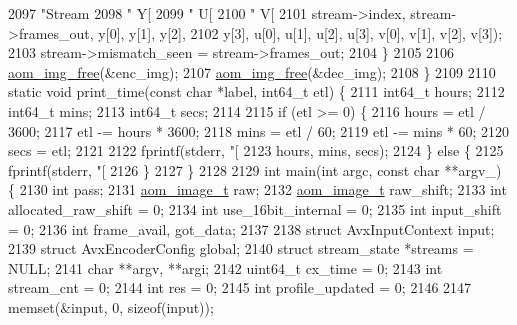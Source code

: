 \begin{DoxyCodeInclude}
{{{{{{{{{{{{{{{{{{{{{{{{{{{{{{{{{{{{{{{{{{{{{2097                           \textcolor{stringliteral}{"Stream %
2098                           \textcolor{stringliteral}{" Y[%
2099                           \textcolor{stringliteral}{" U[%
2100                           \textcolor{stringliteral}{" V[%
2101                           stream->index, stream->frames\_out, y[0], y[1], y[2],
2102                           y[3], u[0], u[1], u[2], u[3], v[0], v[1], v[2], v[3]);
2103     stream->mismatch\_seen = stream->frames\_out;
2104   \}
2105 
2106   \hyperlink{aom__image_8h_afff22f7f3eb9409c5b678d1962f110a8}{aom\_img\_free}(&enc\_img);
2107   \hyperlink{aom__image_8h_afff22f7f3eb9409c5b678d1962f110a8}{aom\_img\_free}(&dec\_img);
2108 \}
2109 
2110 \textcolor{keyword}{static} \textcolor{keywordtype}{void} print\_time(\textcolor{keyword}{const} \textcolor{keywordtype}{char} *label, int64\_t etl) \{
2111   int64\_t hours;
2112   int64\_t mins;
2113   int64\_t secs;
2114 
2115   \textcolor{keywordflow}{if} (etl >= 0) \{
2116     hours = etl / 3600;
2117     etl -= hours * 3600;
2118     mins = etl / 60;
2119     etl -= mins * 60;
2120     secs = etl;
2121 
2122     fprintf(stderr, \textcolor{stringliteral}{"[%
2123             hours, mins, secs);
2124   \} \textcolor{keywordflow}{else} \{
2125     fprintf(stderr, \textcolor{stringliteral}{"[%
2126   \}
2127 \}
2128 
2129 \textcolor{keywordtype}{int} main(\textcolor{keywordtype}{int} argc, \textcolor{keyword}{const} \textcolor{keywordtype}{char} **argv\_) \{
2130   \textcolor{keywordtype}{int} pass;
2131   \hyperlink{structaom__image}{aom\_image\_t} raw;
2132   \hyperlink{structaom__image}{aom\_image\_t} raw\_shift;
2133   \textcolor{keywordtype}{int} allocated\_raw\_shift = 0;
2134   \textcolor{keywordtype}{int} use\_16bit\_internal = 0;
2135   \textcolor{keywordtype}{int} input\_shift = 0;
2136   \textcolor{keywordtype}{int} frame\_avail, got\_data;
2137 
2138   \textcolor{keyword}{struct }AvxInputContext input;
2139   \textcolor{keyword}{struct }AvxEncoderConfig global;
2140   \textcolor{keyword}{struct }stream\_state *streams = NULL;
2141   \textcolor{keywordtype}{char} **argv, **argi;
2142   uint64\_t cx\_time = 0;
2143   \textcolor{keywordtype}{int} stream\_cnt = 0;
2144   \textcolor{keywordtype}{int} res = 0;
2145   \textcolor{keywordtype}{int} profile\_updated = 0;
2146 
2147   memset(&input, 0, \textcolor{keyword}{sizeof}(input));
}}}}}}}}}}}}}}}}}}}}}}}}}}}}}}}}}}}}}}}}}}}}}}}}}}}
\end{DoxyCodeInclude}
